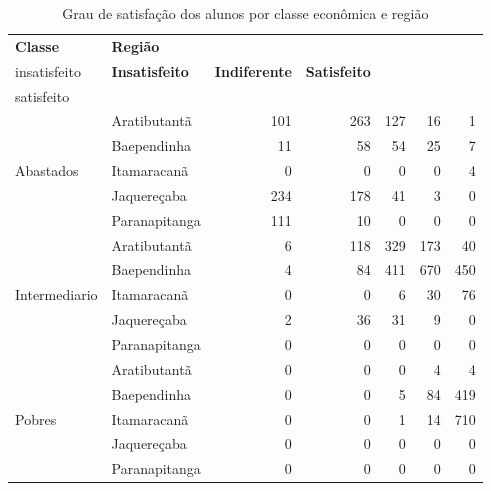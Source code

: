 \begin{table}[h]
\small
\centering
\caption{Grau de satisfação dos alunos por classe econômica e região}
\label{tabela:q16}
\vspace{0.5em}
\begin{tabular}{ll rrrrr}
  \toprule
 \textbf{Classe}        & \textbf{Região}  & \textbf{\specialcell{c}{Muito\\insatisfeito}} & \textbf{Insatisfeito} & \textbf{Indiferente} & \textbf{Satisfeito} & \textbf{\specialcell{c}{Muito\\satisfeito}} \\ 
   \midrule
			& Aratibutantã            &                101 &          263 &         127 &         16 &                1 \\ 
                & Baependinha             &                 11 &           58 &          54 &         25 &                7 \\ 
	Abastados       & Itamaracanã             &                  0 &            0 &           0 &          0 &                4 \\ 
                & Jaquereçaba             &                234 &          178 &          41 &          3 &                0 \\ 
                & Paranapitanga           &                111 &           10 &           0 &          0 &                0 \\ 
\midrule
			& Aratibutantã            &                  6 &          118 &         329 &        173 &               40 \\ 
                & Baependinha             &                  4 &           84 &         411 &        670 &              450 \\ 
	Intermediario & Itamaracanã             &                  0 &            0 &           6 &         30 &               76 \\ 
                & Jaquereçaba             &                  2 &           36 &          31 &          9 &                0 \\ 
                & Paranapitanga           &                  0 &            0 &           0 &          0 &                0 \\ 
\midrule
			& Aratibutantã            &                  0 &            0 &           0 &          4 &                4 \\ 
                & Baependinha             &                  0 &            0 &           5 &         84 &              419 \\ 
	Pobres        & Itamaracanã             &                  0 &            0 &           1 &         14 &              710 \\ 
                & Jaquereçaba             &                  0 &            0 &           0 &          0 &                0 \\ 
                & Paranapitanga           &                  0 &            0 &           0 &          0 &                0 \\ 
   \bottomrule
\end{tabular}
\end{table}

